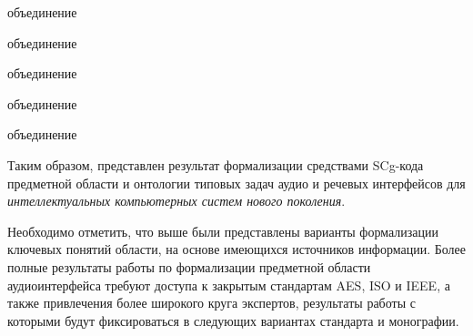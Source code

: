 \begin{SCn}
\begin{scnindent}
    \begin{scnreltoset}{объединение}
    \begin{scnindent}
    \begin{scnreltoset}{объединение}
    \end{scnreltoset}
    \end{scnindent}
    \begin{scnreltoset}{объединение}
    \end{scnreltoset}
    \end{scnreltoset}
\end{scnindent}
\begin{scnindent}
    \begin{scnreltoset}{объединение}
    \begin{scnindent}
    \begin{scnreltoset}{объединение}
    \end{scnreltoset}
    \end{scnindent}
    \end{scnreltoset}
\end{scnindent}
\end{SCn}

Таким образом, представлен результат формализации средствами SCg-кода предметной области и онтологии типовых задач аудио и речевых интерфейсов для \textit{интеллектуальных компьютерных систем нового поколения}.

Необходимо отметить, что выше были представлены варианты формализации ключевых понятий области, на основе имеющихся источников информации. Более полные результаты работы по формализации предметной области аудиоинтерфейса требуют доступа к закрытым стандартам AES, ISO и IEEE, а также привлечения более широкого круга экспертов, результаты работы с которыми будут фиксироваться в следующих вариантах стандарта и монографии.


